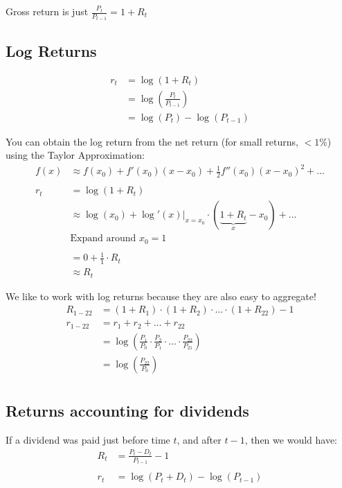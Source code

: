 \documentclass[
  oneside]{book}
\begin{document}
Gross return is just \(\frac{P_{t}}{P_{t-1}} = 1 + R_{t}\)

\hypertarget{log-returns}{%
\subsection{Log Returns}\label{log-returns}}

\[
\begin{aligned}
r_{t} &= \log(1+R_{t})\\
&= \log\left( \frac{P_{t}}{P_{t-1}} \right)\\
&= \log(P_{t}) - \log(P_{t-1})
\end{aligned}
\]

You can obtain the log return from the net return (for small returns, \(<1\%\)) using the Taylor Approximation:
\[
\begin{aligned}
f(x) &\approx f(x_{0}) + f'(x_{0})(x-x_{0}) + \frac{1}{2}f''(x_{0})(x-x_{0})^{2}+\dots\\
\\
r_{t} &= \log(1+R_{t})\\
&\approx \log(x_{0})+\log'(x)|_{x=x_{0}}\cdot (\underbrace{ 1+R_{t} }_{ x }-x_{0})+\dots\\
& \text{Expand around } x_{0} = 1\\
\\
&= 0 + \frac{1}{1}\cdot R_{t}\\
&\approx R_{t}
\end{aligned}
\]

We like to work with log returns because they are also easy to aggregate!
\[
\begin{aligned}
R_{1-22} &= (1+R_{1})\cdot(1+R_{2})\cdot \dots \cdot (1+R_{22}) - 1\\
r_{1-22} &= r_{1} + r_{2} + \dots + r_{22}\\
&= \log\left( \frac{P_{1}}{P_{0}}\cdot \frac{P_{2}}{P_{1}} \cdot \dots \cdot \frac{P_{22}}{P_{21}} \right)\\
&= \log\left( \frac{P_{22}}{P_{0}} \right)\\
\end{aligned}
\]

\hypertarget{returns-accounting-for-dividends}{%
\subsection{Returns accounting for dividends}\label{returns-accounting-for-dividends}}

If a dividend was paid just before time \(t\), and after \(t-1\), then we would have:
\[
\begin{aligned}
R_{t} &= \frac{P_{t}-D_{t}}{P_{t-1}} - 1 \\
\\
r_{t} &= \log(P_{t}+D_{t}) - \log(P_{t-1})
\end{aligned}
\]
\end{document}
